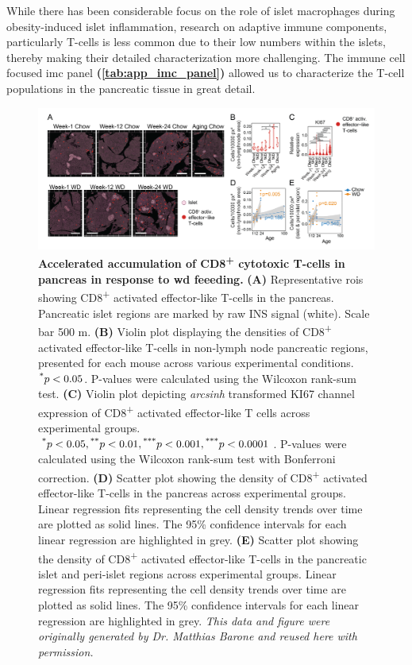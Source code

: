 While there has been considerable focus on the role of islet macrophages during obesity-induced islet inflammation, research on adaptive immune components, particularly T-cells is less common due to their low numbers within the islets, thereby making their detailed characterization more challenging. The immune cell focused \gls{imc} panel \textbf{(\autoref{tab:app_imc_panel})} allowed us to characterize the T-cell populations in the pancreatic tissue in great detail.\\


\begin{figure}[t!]
\centering
\includegraphics[width=\linewidth]{Chapter4/Fig/F2-10-02.png}
\caption[Accelerated accumulation of CD8\textsuperscript{+} cytotoxic T-cells in pancreas]{\textbf{Accelerated accumulation of CD8\textsuperscript{+} cytotoxic T-cells in pancreas in response to \gls{wd} feeeding.} \textbf{(A)} Representative \glspl{roi} showing CD8\textsuperscript{+} activated effector-like T-cells in the pancreas. Pancreatic islet regions are marked by raw INS signal (white).  Scale bar 500 \textmu m. \textbf{(B)} Violin plot displaying the densities of CD8\textsuperscript{+} activated effector-like T-cells in non-lymph node pancreatic regions, presented for each mouse across various experimental conditions. $\textsuperscript{*} p < 0.05$. P-values were calculated using the Wilcoxon rank-sum test. \textbf{(C)} Violin plot depicting \textit{arcsinh} transformed KI67 channel expression of CD8\textsuperscript{+} activated effector-like T cells across experimental groups. $\textsuperscript{*} p < 0.05, \textsuperscript{**} p < 0.01, \textsuperscript{***} p < 0.001, \textsuperscript{***} p < 0.0001$. P-values were calculated using the Wilcoxon rank-sum test with Bonferroni correction. \textbf{(D)} Scatter plot showing the density of CD8\textsuperscript{+} activated effector-like T-cells in the pancreas across experimental groups. Linear regression fits representing the cell density trends over time are plotted as solid lines. The 95\% confidence intervals for each linear regression are highlighted in grey. \textbf{(E)} Scatter plot showing the density of CD8\textsuperscript{+} activated effector-like T-cells in the pancreatic islet and peri-islet regions across experimental groups. Linear regression fits representing the cell density trends over time are plotted as solid lines. The 95\% confidence intervals for each linear regression are highlighted in grey. \textit{This data and figure were originally generated by Dr. Matthias Barone and reused here with permission.}}
\label{fig:chp2_imc_tcells1}
\end{figure}

